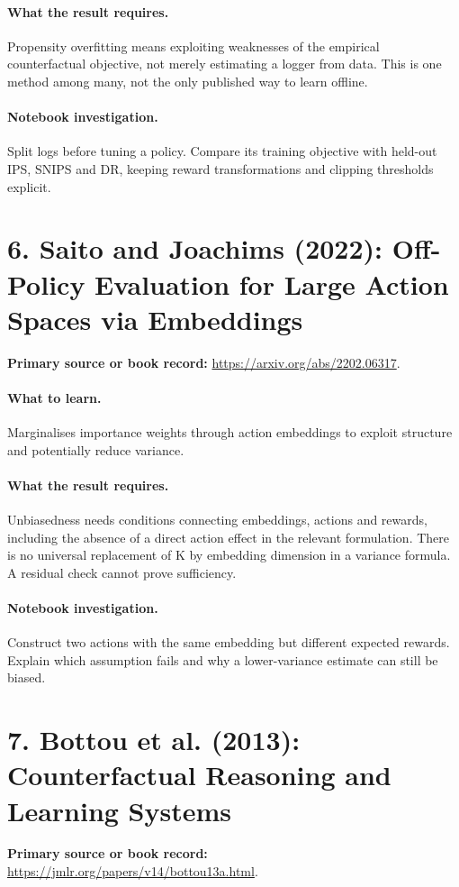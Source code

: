 \documentclass[11pt]{scrartcl}
\begin{document}
\paragraph{What the result requires.} Propensity overfitting means exploiting weaknesses of the empirical counterfactual objective, not merely estimating a logger from data. This is one method among many, not the only published way to learn offline.

\paragraph{Notebook investigation.} Split logs before tuning a policy. Compare its training objective with held-out IPS, SNIPS and DR, keeping reward transformations and clipping thresholds explicit.

\section*{6. Saito and Joachims (2022): Off-Policy Evaluation for Large Action Spaces via Embeddings}
\textbf{Primary source or book record:} \url{https://arxiv.org/abs/2202.06317}.

\paragraph{What to learn.} Marginalises importance weights through action embeddings to exploit structure and potentially reduce variance.

\paragraph{What the result requires.} Unbiasedness needs conditions connecting embeddings, actions and rewards, including the absence of a direct action effect in the relevant formulation. There is no universal replacement of K by embedding dimension in a variance formula. A residual check cannot prove sufficiency.

\paragraph{Notebook investigation.} Construct two actions with the same embedding but different expected rewards. Explain which assumption fails and why a lower-variance estimate can still be biased.

\section*{7. Bottou et al. (2013): Counterfactual Reasoning and Learning Systems}
\textbf{Primary source or book record:} \url{https://jmlr.org/papers/v14/bottou13a.html}.
\end{document}
